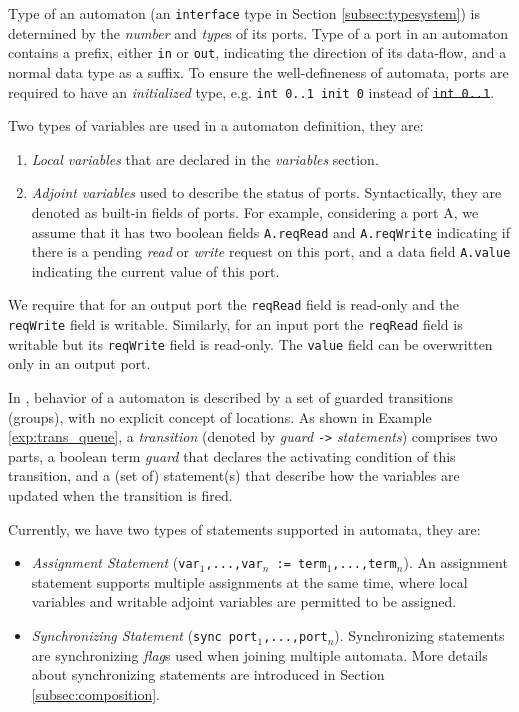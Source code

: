  Type of an automaton (an \texttt{interface} type in Section \ref{subsec:typesystem}) is determined by the \emph{number} and \emph{type}s of its ports. Type of a port in an automaton contains a prefix, either \texttt{in} or \texttt{out}, indicating the direction of its data-flow, and a normal data type as a suffix. To ensure the well-defineness of automata, ports are required to have an \emph{initialized} type, e.g. \texttt{int 0..1 init 0} instead of \sout{\texttt{int 0..1}}.

 Two types of variables are used in a automaton definition, they are:
\begin{enumerate}
    \item \emph{Local variables} that are declared in the \emph{variables} section. 
    \item \emph{Adjoint variables} used to describe the status of ports. Syntactically, they are denoted as built-in fields of ports. For example, considering a port A, we assume that it has two boolean fields \texttt{A.reqRead} and \texttt{A.reqWrite} indicating if there is a pending \emph{read} or \emph{write} request on this port, and a data field \texttt{A.value} indicating the current value of this port.
\end{enumerate}

We require that for an output port the \texttt{reqRead} field is read-only and the \texttt{reqWrite} field is writable. Similarly, for an input port the \texttt{reqRead} field is writable but its \texttt{reqWrite} field is read-only. The \texttt{value} field can be overwritten only in an output port.

In \lang{}, behavior of a automaton is described by a set of guarded transitions (groups), with no explicit concept of locations. As shown in  Example \ref{exp:trans_queue}, a \emph{transition} (denoted by \emph{guard} \texttt{->} \emph{statements}) comprises two parts, a boolean term \emph{guard} that declares the activating condition of this transition, and a (set of) statement(s) that describe how the variables are updated when the transition is fired.

Currently, we have two types of statements supported in automata, they are:
\begin{itemize}
    \item \emph{Assignment Statement} (\texttt{var$_1$,...,var$_n$ := term$_1$,...,term$_n$}). An assignment statement supports multiple assignments at the same time, where local variables and writable adjoint variables are permitted to be assigned.
    \item \emph{Synchronizing Statement} (\texttt{sync port$_1$,...,port$_n$}). Synchronizing statements are synchronizing \emph{flag}s used when joining multiple automata. More details about synchronizing statements are introduced in Section \ref{subsec:composition}.
\end{itemize}

